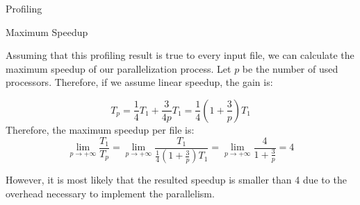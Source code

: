 \begin{section}{Profiling}
\begin{subsection}{Maximum Speedup}\label{sec:speedup}

Assuming that this profiling result is true to every input file, we can
calculate the maximum speedup of our parallelization process. Let $p$ be the
number of used processors. Therefore, if we assume linear speedup, the gain is:

$$ T_p = \frac{1}{4} T_1 + \frac{3}{4p}T_1 = \frac{1}{4} \left( 1 + \frac{3}{p}
\right)T_1 $$ Therefore, the maximum speedup per file is: $$
\lim_{p \rightarrow +\infty} \frac{T_1}{T_p} = \lim_{p \rightarrow +\infty}
\frac{T_1}{\frac{1}{4} \left( 1 + \frac{3}{p} \right)T_1} = \lim_{p \rightarrow
+\infty} \frac{4}{1 + \frac{3}{p}} = 4$$

However, it is most likely that the resulted speedup is smaller than 4 due to
the overhead necessary to implement the parallelism.

\end{subsection}

\end{section}

